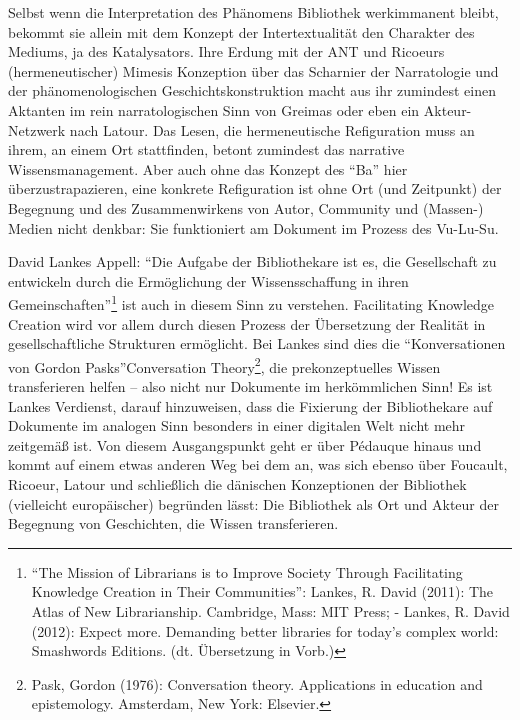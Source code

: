 Selbst wenn die Interpretation des Phänomens Bibliothek werkimmanent
bleibt, bekommt sie allein mit dem Konzept der Intertextualität den
Charakter des Mediums, ja des Katalysators. Ihre Erdung mit der ANT und
Ricoeurs (hermeneutischer) Mimesis Konzeption über das Scharnier der
Narratologie und der phänomenologischen Geschichtskonstruktion macht aus
ihr zumindest einen Aktanten im rein narratologischen Sinn von Greimas
oder eben ein Akteur-Netzwerk nach Latour. Das Lesen, die hermeneutische
Refiguration muss an ihrem, an einem Ort stattfinden, betont zumindest
das narrative Wissensmanagement. Aber auch ohne das Konzept des \enquote{Ba}
hier überzustrapazieren, eine konkrete Refiguration ist ohne Ort (und
Zeitpunkt) der Begegnung und des Zusammenwirkens von Autor, Community
und (Massen-) Medien nicht denkbar: Sie funktioniert am Dokument im
Prozess des Vu-Lu-Su.

David Lankes Appell: \enquote{Die Aufgabe der Bibliothekare ist es, die
Gesellschaft zu entwickeln durch die Ermöglichung der Wissensschaffung
in ihren Gemeinschaften}\footnote{\enquote{The Mission of Librarians is to
  Improve Society Through Facilitating Knowledge Creation in Their
  Communities}: Lankes, R. David (2011): The Atlas of New Librarianship.
  Cambridge, Mass: MIT Press; - Lankes, R. David (2012): Expect more.
  Demanding better libraries for today's complex world: Smashwords
  Editions. (dt. Übersetzung in Vorb.)} ist auch in diesem Sinn zu
verstehen. Facilitating Knowledge Creation wird vor allem durch diesen
Prozess der Übersetzung der Realität in gesellschaftliche Strukturen
ermöglicht. Bei Lankes sind dies die \enquote{Konversationen von Gordon
Pasks}Conversation Theory\footnote{Pask, Gordon (1976): Conversation
  theory. Applications in education and epistemology. Amsterdam, New
  York: Elsevier.}, die prekonzeptuelles Wissen transferieren helfen --
also nicht nur Dokumente im herkömmlichen Sinn! Es ist Lankes Verdienst,
darauf hinzuweisen, dass die Fixierung der Bibliothekare auf Dokumente
im analogen Sinn besonders in einer digitalen Welt nicht mehr zeitgemäß
ist. Von diesem Ausgangspunkt geht er über Pédauque hinaus und kommt auf
einem etwas anderen Weg bei dem an, was sich ebenso über Foucault,
Ricoeur, Latour und schließlich die dänischen Konzeptionen der
Bibliothek (vielleicht europäischer) begründen lässt: Die Bibliothek als
Ort und Akteur der Begegnung von Geschichten, die Wissen transferieren.

